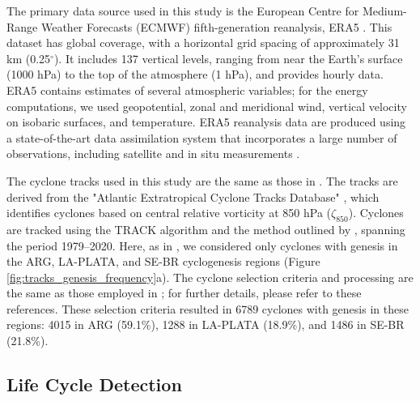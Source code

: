 \documentclass[pdflatex,sn-chicago]{sn-jnl}%
\theoremstyle{plain}
\theoremstyle{definition}
\theoremstyle{remark}
\theoremstyle{definition}
\begin{document}
The primary data source used in this study is the European Centre for Medium-Range Weather Forecasts (ECMWF) fifth-generation reanalysis, ERA5 \citep{hersbach2020era5}. This dataset has global coverage, with a horizontal grid spacing of approximately 31 km (0.25$^\circ$). It includes 137 vertical levels, ranging from near the Earth's surface (1000 hPa) to the top of the atmosphere (1 hPa), and provides hourly data. ERA5 contains estimates of several atmospheric variables; for the energy computations, we used geopotential, zonal and meridional wind, vertical velocity on isobaric surfaces, and temperature. ERA5 reanalysis data are produced using a state-of-the-art data assimilation system that incorporates a large number of observations, including satellite and in situ measurements \citep{hersbach2020era5}.

The cyclone tracks used in this study are the same as those in \citet{gramcianinov2020analysis, couto2024new, de2025lorenz}. The tracks are derived from the "Atlantic Extratropical Cyclone Tracks Database" \citep{gramcianinov2020data}, which identifies cyclones based on central relative vorticity at 850 hPa ($\zeta_{850}$). Cyclones are tracked using the TRACK algorithm \citep{hodges1994general, hodges1995feature} and the method outlined by \citet{hoskins2002new}, spanning the period 1979--2020. Here, as in \citet{de2025lorenz}, we considered only cyclones with genesis in the ARG, LA-PLATA, and SE-BR cyclogenesis regions (Figure \ref{fig:tracks_genesis_frequency}a). The cyclone selection criteria and processing are the same as those employed in \citet{couto2024new, de2025lorenz}; for further details, please refer to these references. These selection criteria resulted in 6789 cyclones with genesis in these regions: 4015 in ARG (59.1\%), 1288 in LA-PLATA (18.9\%), and 1486 in SE-BR (21.8\%).

\subsection{Life Cycle Detection}
\label{sec:life_cycle}
\end{document}
